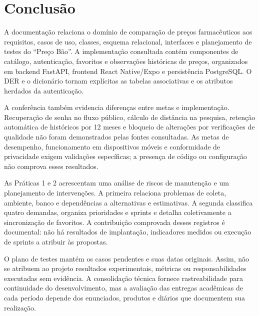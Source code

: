 \chapter{Conclusão}\label{cap:conclusao}

A documentação relaciona o domínio de comparação de preços farmacêuticos aos requisitos, casos de uso, classes, esquema relacional, interfaces e planejamento de testes do ``Preço Bão''. A implementação consultada contém componentes de catálogo, autenticação, favoritos e observações históricas de preços, organizados em backend FastAPI, frontend React Native/Expo e persistência PostgreSQL. O DER e o dicionário tornam explícitas as tabelas associativas e os atributos herdados da autenticação.

A conferência também evidencia diferenças entre metas e implementação. Recuperação de senha no fluxo público, cálculo de distância na pesquisa, retenção automática de históricos por 12 meses e bloqueio de alterações por verificações de qualidade não foram demonstrados pelas fontes consultadas. As metas de desempenho, funcionamento em dispositivos móveis e conformidade de privacidade exigem validações específicas; a presença de código ou configuração não comprova esses resultados.

As Práticas 1 e 2 acrescentam uma análise de riscos de manutenção e um planejamento de intervenções. A primeira relaciona problemas de coleta, ambiente, banco e dependências a alternativas e estimativas. A segunda classifica quatro demandas, organiza prioridades e sprints e detalha coletivamente a sincronização de favoritos. A contribuição comprovada desses registros é documental: não há resultados de implantação, indicadores medidos ou execução de sprints a atribuir às propostas.

O plano de testes mantém os casos pendentes e suas datas originais. Assim, não se atribuem ao projeto resultados experimentais, métricas ou responsabilidades executadas sem evidência. A consolidação técnica fornece rastreabilidade para continuidade do desenvolvimento, mas a avaliação das entregas acadêmicas de cada período depende dos enunciados, produtos e diários que documentem sua realização.
